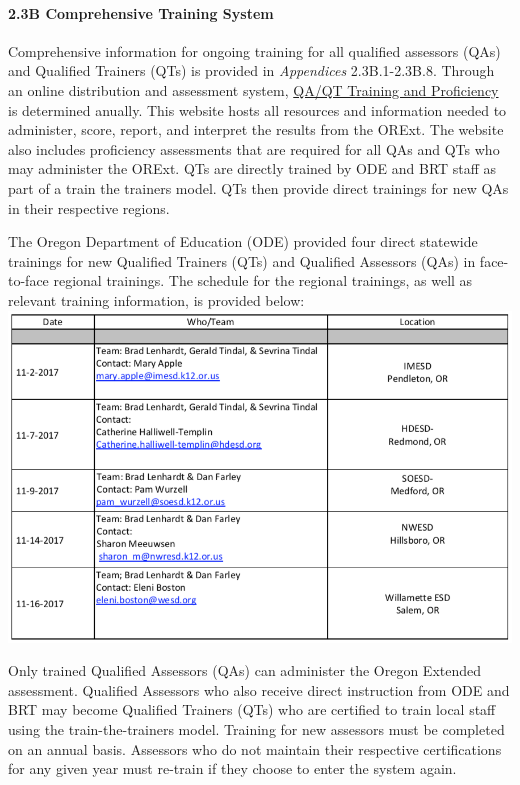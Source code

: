 \documentclass[]{article}
\let\oldparagraph\paragraph
\renewcommand{\paragraph}[1]{\oldparagraph{#1}\mbox{}}
\begin{document}
\paragraph{2.3B Comprehensive Training
System}\label{b-comprehensive-training-system}

Comprehensive information for ongoing training for all qualified
assessors (QAs) and Qualified Trainers (QTs) is provided in
\emph{Appendices} 2.3B.1-2.3B.8. Through an online distribution and
assessment system, \color{link}\href{https://or.k12test.com/}{QA/QT
Training and Proficiency} \color{black} is determined anually. This
website hosts all resources and information needed to administer, score,
report, and interpret the results from the ORExt. The website also
includes proficiency assessments that are required for all QAs and QTs
who may administer the ORExt. QTs are directly trained by ODE and BRT
staff as part of a train the trainers model. QTs then provide direct
trainings for new QAs in their respective regions.

The Oregon Department of Education (ODE) provided four direct statewide
trainings for new Qualified Trainers (QTs) and Qualified Assessors (QAs)
in face-to-face regional trainings. The schedule for the regional
trainings, as well as relevant training information, is provided below:
\FloatBarrier
\includegraphics{Figures/TrainingSched/TraingSched.png}

Only trained Qualified Assessors (QAs) can administer the Oregon
Extended assessment. Qualified Assessors who also receive direct
instruction from ODE and BRT may become Qualified Trainers (QTs) who are
certified to train local staff using the train-the-trainers model.
Training for new assessors must be completed on an annual basis.
Assessors who do not maintain their respective certifications for any
given year must re-train if they choose to enter the system again.
\end{document}
